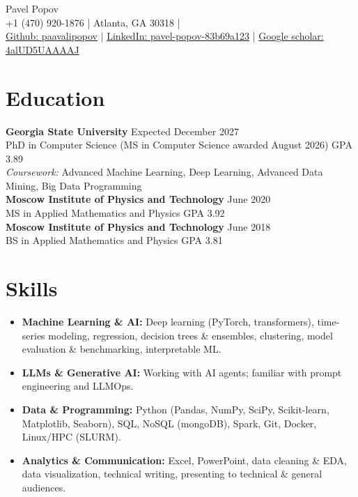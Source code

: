 \documentclass[11pt,a4paper]{article}
\begin{document}
\begin{center}
  {\Huge Pavel Popov}\\[0.5em]
  {\footnotesize +1 (470) 920-1876 \quad | \quad Atlanta, GA 30318} \quad | \\
  {\small \href{https://github.com/paavalipopov}{Github: paavalipopov} \quad | \quad
  \href{https://www.linkedin.com/in/pavel-popov-83b69a123/}{LinkedIn: pavel-popov-83b69a123} \quad | \quad
  \href{https://scholar.google.com/citations?user=4alUD5UAAAAJ}{Google scholar: 4alUD5UAAAAJ}}
\end{center}

\section*{Education}
\noindent\textbf{Georgia State University} \hfill Expected December 2027\\
PhD in Computer Science (MS in Computer Science awarded August 2026) \hfill GPA 3.89\\
{\small\textit{Coursework:} Advanced Machine Learning, Deep Learning, Advanced Data Mining, Big Data Programming}\\[0.3em]
\textbf{Moscow Institute of Physics and Technology} \hfill June 2020\\
MS in Applied Mathematics and Physics \hfill
GPA 3.92\\[0.3em]
\textbf{Moscow Institute of Physics and Technology} \hfill June 2018\\
BS in Applied Mathematics and Physics \hfill
GPA 3.81

\section*{Skills}
\begin{itemize}
[leftmargin=*,noitemsep]
\item \textbf{Machine Learning \& AI:} Deep learning (PyTorch, transformers), time-series modeling, regression, decision trees \& ensembles, clustering, model evaluation \& benchmarking, interpretable ML.
\item \textbf{LLMs \& Generative AI:} Working with AI agents; familiar with prompt engineering and LLMOps.
\item \textbf{Data \& Programming:} Python (Pandas, NumPy, SciPy, Scikit-learn, Matplotlib, Seaborn), SQL, NoSQL (mongoDB), Spark, Git, Docker, Linux/HPC (SLURM).
\item \textbf{Analytics \& Communication:} Excel, PowerPoint, data cleaning \& EDA, data visualization, technical writing, presenting to technical \& general audiences.
\end{itemize}
\end{document}
